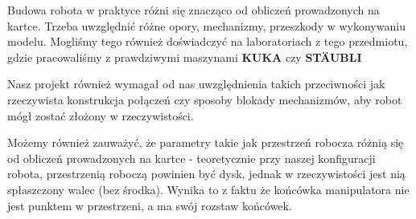 Budowa robota w praktyce różni się znacząco od obliczeń prowadzonych na kartce. Trzeba uwzględnić różne opory, mechanizmy, przeszkody w wykonywaniu modelu. Mogliśmy tego również doświadczyć na laboratoriach z tego przedmiotu, gdzie pracowaliśmy z prawdziwymi maszynami \textbf{KUKA} czy \textbf{STÄUBLI}


Nasz projekt również wymagał od nas uwzględnienia takich przeciwności jak rzeczywista konstrukcja połączeń czy sposoby blokady mechanizmów, aby robot mógł zostać złożony w rzeczywistości.


Możemy również zauważyć, że parametry takie jak przestrzeń robocza różnią się od obliczeń prowadzonych na kartce - teoretycznie przy naszej konfiguracji robota, przestrzenią roboczą powinien być dysk, jednak w rzeczywistości jest nią spłaszczony walec (bez środka). Wynika to z faktu że końcówka manipulatora nie jest punktem w przestrzeni, a ma swój rozstaw końcówek.